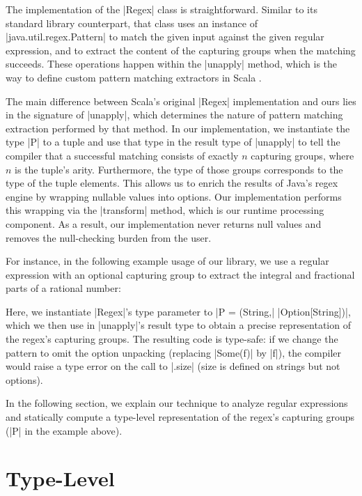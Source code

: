 The implementation of the |Regex| class is straightforward.
Similar to its standard library counterpart, that class uses an instance of |java.util.regex.Pattern| to match the given input against the given regular expression, and to extract the content of the capturing groups when the matching succeeds.
These operations happen within the |unapply| method, which is the way to define custom pattern matching extractors in Scala \citep{emir2007matching}.

The main difference between Scala's original |Regex| implementation and ours lies in the signature of |unapply|, which determines the nature of pattern matching extraction performed by that method.
In our implementation, we instantiate the type |P| to a tuple and use that type in the result type of |unapply| to tell the compiler that a successful matching consists of exactly $n$ capturing groups, where $n$ is the tuple's arity.
Furthermore, the type of those groups corresponds to the type of the tuple elements.
This allows us to enrich the results of Java's regex engine by wrapping nullable values into options.
Our implementation performs this wrapping via the |transform| method, which is our runtime processing component.
As a result, our implementation never returns null values and removes the null-checking burden from the user.

For instance, in the following example usage of our library, we use a regular expression with an optional capturing group to extract the integral and fractional parts of a rational number:

\regexRational

\noindent
Here, we instantiate |Regex|'s type parameter to |P = (String,| |Option[String])|, which we then use in |unapply|'s result type to obtain a precise representation of the regex's capturing groups.
The resulting code is type-safe: if we change the pattern to omit the option unpacking (replacing |Some(f)| by |f|), the compiler would raise a type error on the call to |.size| (size is defined on strings but not options).

In the following section, we explain our technique to analyze regular expressions and statically compute a type-level representation of the regex's capturing groups (|P| in the example above).

\section{Type-Level}
\label{sec:type-level}

